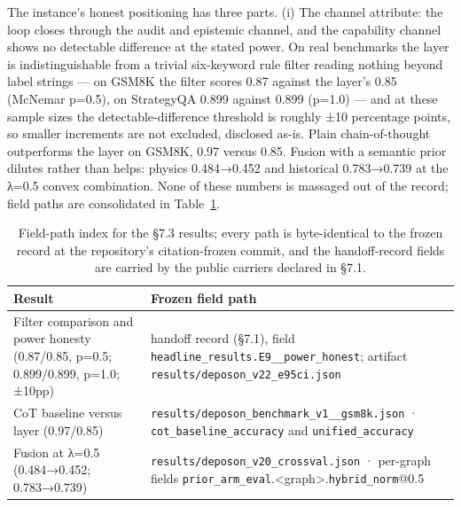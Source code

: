 \documentclass[11pt,a4paper]{article}
\begin{document}
The instance's honest positioning has three parts. (i) The channel attribute: the loop closes through the audit and epistemic channel, and the capability channel shows no detectable difference at the stated power. On real benchmarks the layer is indistinguishable from a trivial six-keyword rule filter reading nothing beyond label strings — on GSM8K the filter scores 0.87 against the layer's 0.85 (McNemar p=0.5), on StrategyQA 0.899 against 0.899 (p=1.0) — and at these sample sizes the detectable-difference threshold is roughly ±10 percentage points, so smaller increments are not excluded, disclosed as-is. Plain chain-of-thought outperforms the layer on GSM8K, 0.97 versus 0.85. Fusion with a semantic prior dilutes rather than helps: physics 0.484→0.452 and historical 0.783→0.739 at the λ=0.5 convex combination. None of these numbers is massaged out of the record; field paths are consolidated in Table~\ref{tab:fieldpathsS}.

\begin{table}[htbp]
\centering
\small
\setlength{\tabcolsep}{4pt}
\renewcommand{\arraystretch}{1.15}
\begin{tabularx}{0.985\textwidth}{@{}>{\raggedright\arraybackslash}p{}>{\raggedright\arraybackslash}X@{}}
\toprule
\textbf{Result} & \textbf{Frozen field path} \\
\midrule
Filter comparison and power honesty (0.87/0.85, p=0.5; 0.899/0.899, p=1.0; ±10pp) & handoff record (§7.1), field \texttt{headline\_\allowbreak results.E9\_\allowbreak 5\_\allowbreak power\_\allowbreak honest}; artifact \texttt{results/\allowbreak deposon\_\allowbreak v22\_\allowbreak e95ci.json} \\
CoT baseline versus layer (0.97/0.85) & \texttt{results/\allowbreak deposon\_\allowbreak benchmark\_\allowbreak v1\_\allowbreak 4\_\allowbreak gsm8k.json} · \texttt{cot\_\allowbreak baseline\_\allowbreak accuracy} and \texttt{unified\_\allowbreak accuracy} \\
Fusion at λ=0.5 (0.484→0.452; 0.783→0.739) & \texttt{results/\allowbreak deposon\_\allowbreak v20\_\allowbreak crossval.json} · per-graph fields \texttt{prior\_\allowbreak arm\_\allowbreak eval}.<graph>.\texttt{hybrid\_\allowbreak norm}@0.5 \\
\bottomrule
\end{tabularx}
\caption{Field-path index for the §7.3 results; every path is byte-identical to the frozen record at the repository's citation-frozen commit, and the handoff-record fields are carried by the public carriers declared in §7.1.}
\label{tab:fieldpathsS}
\end{table}
\end{document}
